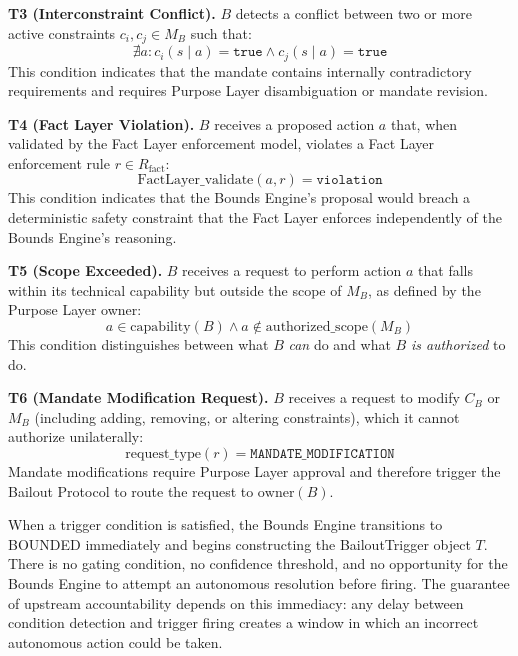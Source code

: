 \bigskip

\noindent\textbf{T3 (Interconstraint Conflict).} $B$ detects a conflict between two or more active constraints $c_i, c_j \in M_B$ such that:
\begin{equation}
\nexists a : c_i(s \mid a) = \texttt{true} \land c_j(s \mid a) = \texttt{true}
\end{equation}
This condition indicates that the mandate contains internally contradictory requirements and requires Purpose Layer disambiguation or mandate revision.

\bigskip

\noindent\textbf{T4 (Fact Layer Violation).} $B$ receives a proposed action $a$ that, when validated by the Fact Layer enforcement model, violates a Fact Layer enforcement rule $r \in R_{\text{fact}}$:
\begin{equation}
\text{FactLayer\_validate}(a, r) = \texttt{violation}
\end{equation}
This condition indicates that the Bounds Engine's proposal would breach a deterministic safety constraint that the Fact Layer enforces independently of the Bounds Engine's reasoning.

\bigskip

\noindent\textbf{T5 (Scope Exceeded).} $B$ receives a request to perform action $a$ that falls within its technical capability but outside the scope of $M_B$, as defined by the Purpose Layer owner:
\begin{equation}
a \in \text{capability}(B) \land a \notin \text{authorized\_scope}(M_B)
\end{equation}
This condition distinguishes between what $B$ \textit{can} do and what $B$ \textit{is authorized} to do.

\bigskip

\noindent\textbf{T6 (Mandate Modification Request).} $B$ receives a request to modify $C_B$ or $M_B$ (including adding, removing, or altering constraints), which it cannot authorize unilaterally:
\begin{equation}
\text{request\_type}(r) = \texttt{MANDATE\_MODIFICATION}
\end{equation}
Mandate modifications require Purpose Layer approval and therefore trigger the Bailout Protocol to route the request to $\text{owner}(B)$.

\bigskip

When a trigger condition is satisfied, the Bounds Engine transitions to BOUNDED immediately and begins constructing the BailoutTrigger object $T$. There is no gating condition, no confidence threshold, and no opportunity for the Bounds Engine to attempt an autonomous resolution before firing. The guarantee of upstream accountability depends on this immediacy: any delay between condition detection and trigger firing creates a window in which an incorrect autonomous action could be taken.

